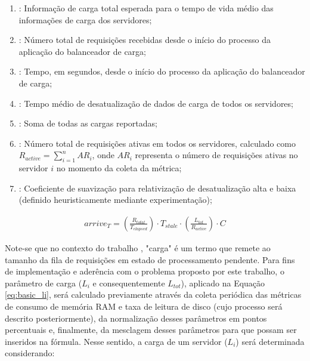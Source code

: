 \begin{enumerate}
\item[$arrive_T$]: Informação de carga total esperada para o tempo de vida médio das informações de carga dos servidores;
\item[$R_{total}$]: Número total de requisições recebidas desde o início do processo da aplicação do balanceador de carga;
\item[$T_{elapsed}$]: Tempo, em segundos, desde o início do processo da aplicação do balanceador de carga;
\item[$T_{stale}$]: Tempo médio de desatualização de dados de carga de todos os servidores;
\item[$L_{tot}$]: Soma de todas as cargas reportadas;
\item[$R_{active}$]: Número total de requisições ativas em todos os servidores, calculado como $R_{active} = \sum_{i=1}^{n} AR_i$, onde $AR_i$ representa o número de requisições ativas no servidor $i$ no momento da coleta da métrica;
\item[$C$]: Coeficiente de suavização para relativização de desatualização alta e baixa (definido heuristicamente mediante experimentação);
\end{enumerate}

\begin{gather} \label{eq:arrive_t} 
arrive_T = \left( \frac{R_{total}}{T_{elapsed}} \right) \cdot T_{stale} \cdot \left( \frac{L_{tot}}{R_{active}} \right) \cdot C \end{gather}

Note-se que no contexto do trabalho \cite{interpretingStaleLoadInformation2000}, "carga" é um termo que remete ao tamanho da fila de requisições em estado de processamento pendente. Para fins de implementação e aderência com o problema proposto por este trabalho, o parâmetro de carga ($L_i$ e consequentemente $L_{tot}$), aplicado na Equação \mbox{\ref{eq:basic_li}}, será calculado previamente através da coleta periódica das métricas de consumo de memória RAM e taxa de leitura de disco (cujo processo será descrito posteriormente), da normalização desses parâmetros em pontos percentuais e, finalmente, da mesclagem desses parâmetros para que possam ser inseridos na fórmula. Nesse sentido, a carga de um servidor ($L_i$) será determinada considerando:

